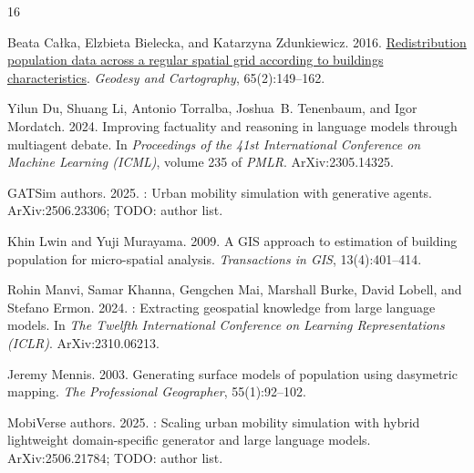 \documentclass[11pt]{article}
\begin{document}
\begin{thebibliography}{16}
\providecommand{\natexlab}[1]{#1}

Beata Ca{\l}ka, Elzbieta Bielecka, and Katarzyna Zdunkiewicz. 2016.
\newblock \href {https://doi.org/10.1515/geocart-2016-0011} {Redistribution
  population data across a regular spatial grid according to buildings
  characteristics}.
\newblock \emph{Geodesy and Cartography}, 65(2):149--162.

Yilun Du, Shuang Li, Antonio Torralba, Joshua~B. Tenenbaum, and Igor Mordatch.
  2024.
\newblock Improving factuality and reasoning in language models through
  multiagent debate.
\newblock In \emph{Proceedings of the 41st International Conference on Machine
  Learning (ICML)}, volume 235 of \emph{PMLR}.
\newblock ArXiv:2305.14325.

{GATSim authors}. 2025.
: Urban mobility simulation with generative agents.
\newblock ArXiv:2506.23306; TODO: author list.

Khin Lwin and Yuji Murayama. 2009.
\newblock A {GIS} approach to estimation of building population for
  micro-spatial analysis.
\newblock \emph{Transactions in GIS}, 13(4):401--414.

Rohin Manvi, Samar Khanna, Gengchen Mai, Marshall Burke, David Lobell, and
  Stefano Ermon. 2024.
: Extracting geospatial knowledge from large language models.
\newblock In \emph{The Twelfth International Conference on Learning
  Representations (ICLR)}.
\newblock ArXiv:2310.06213.

Jeremy Mennis. 2003.
\newblock Generating surface models of population using dasymetric mapping.
\newblock \emph{The Professional Geographer}, 55(1):92--102.

{MobiVerse authors}. 2025.
: Scaling urban mobility simulation with hybrid
  lightweight domain-specific generator and large language models.
\newblock ArXiv:2506.21784; TODO: author list.


\end{thebibliography}
\end{document}

